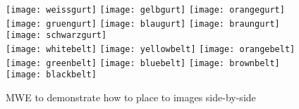 

	\layout
	
	
	\tableofcontents\newpage
	\begin{figure}
		\texttt{[image: weissgurt]}\hfill
		\texttt{[image: gelbgurt]}\hfill
		\texttt{[image: orangegurt]}\hfill
		\texttt{[image: gruengurt]}\hfill
		\texttt{[image: blaugurt]}\hfill
		\texttt{[image: braungurt]}\hfill
		\texttt{[image: schwarzgurt]}\\
		\texttt{[image: whitebelt]}\hfill
		\texttt{[image: yellowbelt]}\hfill
		\texttt{[image: orangebelt]}\hfill
		\texttt{[image: greenbelt]}\hfill
		\texttt{[image: bluebelt]}\hfill
		\texttt{[image: brownbelt]}\hfill
		\texttt{[image: blackbelt]}\\
		\caption{MWE to demonstrate how to place to images side-by-side}
	\end{figure}
	\clearpage
	\newpage
	
	\Blinddocument

